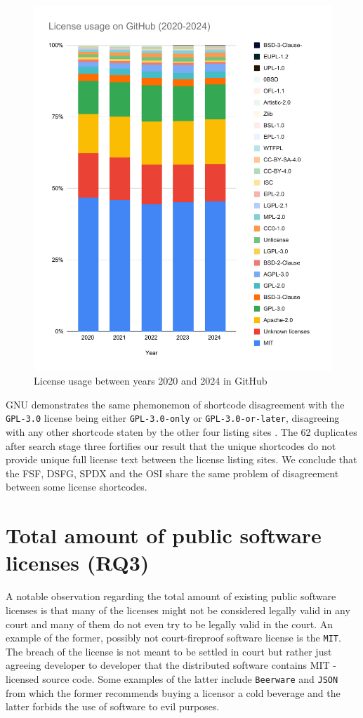 \begin{figure}
	\centering
	\includegraphics[scale=0.73]{figures/figure-3-5.pdf}
	\caption{License usage between years 2020 and 2024 in GitHub}
	\label{fig:3-5}
\end{figure}
GNU demonstrates the same phemonemon of shortcode disagreement with the \texttt{GPL-3.0} license being either \texttt{GPL-3.0-only} or \texttt{GPL-3.0-or-later}, disagreeing with any other shortcode staten by the other four listing sites \citep{gnu:licenselist}. The 62 duplicates after search stage three fortifies our result that the unique shortcodes do not provide unique full license text between the license listing sites. We conclude that the FSF, DSFG, SPDX and the OSI share the same problem of disagreement between some license shortcodes.

\section{Total amount of public software licenses (RQ3)}
A notable observation regarding the total amount of existing public software licenses is that many of the licenses might not be considered legally valid in any court and many of them do not even try to be legally valid in the court. An example of the former, possibly not court-fireproof software license is the \texttt{MIT}. The breach of the license is not meant to be settled in court but rather just agreeing developer to developer that the distributed software contains MIT -licensed source code. Some examples of the latter include \texttt{Beerware} and \texttt{JSON} from which the former recommends buying a licensor a cold beverage and the latter forbids the use of software to evil purposes. 

